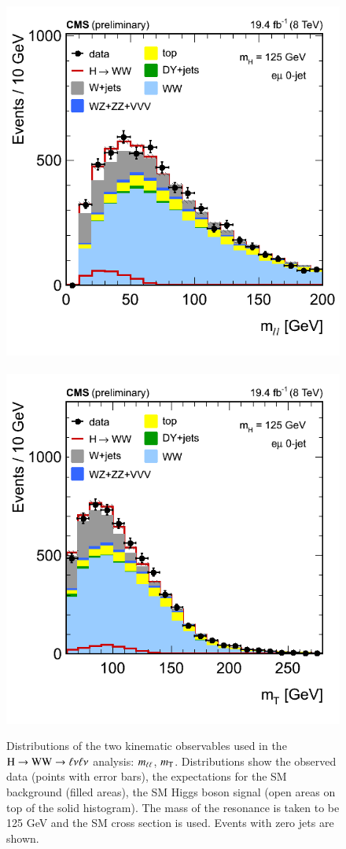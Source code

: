 \begin{figure}[!p]
\begin{center}
\centerline{
\includegraphics[width=0.50\linewidth]{figures/wwpresel_0j_mh125_massll.png}
~~~~~
\includegraphics[width=0.50\linewidth]{figures/wwpresel_0j_mh125_mt.png}
}
\caption{ 
  Distributions of the two kinematic observables
  used in the $\mathrm{H}\to\mathrm{W}\mathrm{W}\to\ell\nu\ell\nu$ analysis: $m_{\ell\ell}$, $m_{\mathrm{T}}$.  Distributions
  show the observed data (points with error bars), the expectations
  for the SM background (filled areas), the SM Higgs boson signal
  (open areas on top of the solid histogram).  The
  mass of the resonance is taken to be 125 GeV and the SM cross
  section is used.  Events with zero jets are shown.  
\label{fig:hwwkinematics} }
\end{center}
\end{figure}


\

